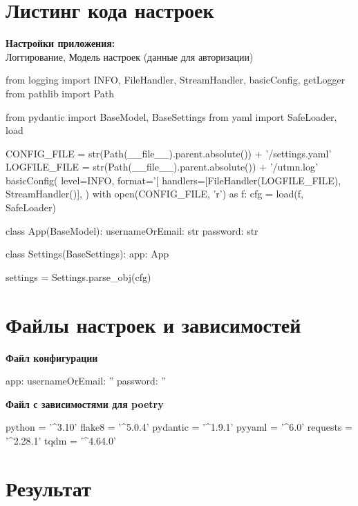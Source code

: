 \documentclass[a4paper,12pt]{article} %
\begin{document}
\section{Листинг кода настроек}

\textbf{Настройки приложения:} \\
Логгирование, Модель настроек (данные для авторизации)
\begin{python}
from logging import INFO, FileHandler, StreamHandler, basicConfig, getLogger
from pathlib import Path

from pydantic import BaseModel, BaseSettings
from yaml import SafeLoader, load

CONFIG_FILE = str(Path(__file__).parent.absolute()) + '/settings.yaml'
LOGFILE_FILE = str(Path(__file__).parent.absolute()) + '/utmn.log'
basicConfig(
    level=INFO,
    format='[%
    handlers=[FileHandler(LOGFILE_FILE), StreamHandler()],
)
with open(CONFIG_FILE, 'r') as f:
    cfg = load(f, SafeLoader)


class App(BaseModel):
    usernameOrEmail: str
    password: str


class Settings(BaseSettings):
    app: App


settings = Settings.parse_obj(cfg)
\end{python}

\section{Файлы настроек и зависимостей}

\textbf{Файл конфигурации}
\begin{python}
app:
  usernameOrEmail: ''
  password: ''
\end{python}
\textbf{Файл с зависимостями для poetry}
\begin{python}
python = '^3.10'
flake8 = '^5.0.4'
pydantic = '^1.9.1'
pyyaml = '^6.0'
requests = '^2.28.1'
tqdm = '^4.64.0'
\end{python}
\newpage

\section*{Результат}
\end{document}
